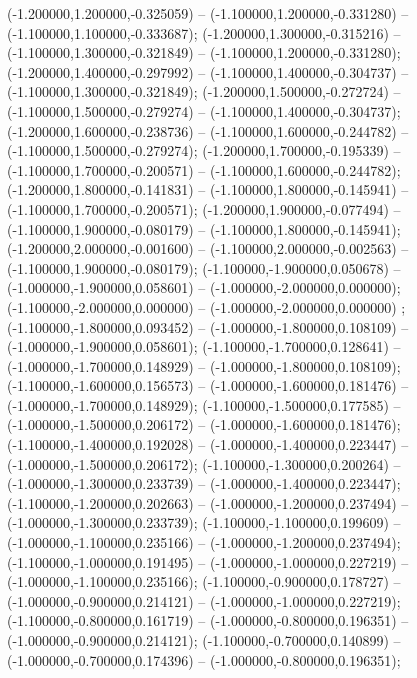  (-1.200000,1.200000,-0.325059) -- (-1.100000,1.200000,-0.331280) -- (-1.100000,1.100000,-0.333687);
 (-1.200000,1.300000,-0.315216) -- (-1.100000,1.300000,-0.321849) -- (-1.100000,1.200000,-0.331280);
 (-1.200000,1.400000,-0.297992) -- (-1.100000,1.400000,-0.304737) -- (-1.100000,1.300000,-0.321849);
 (-1.200000,1.500000,-0.272724) -- (-1.100000,1.500000,-0.279274) -- (-1.100000,1.400000,-0.304737);
 (-1.200000,1.600000,-0.238736) -- (-1.100000,1.600000,-0.244782) -- (-1.100000,1.500000,-0.279274);
 (-1.200000,1.700000,-0.195339) -- (-1.100000,1.700000,-0.200571) -- (-1.100000,1.600000,-0.244782);
 (-1.200000,1.800000,-0.141831) -- (-1.100000,1.800000,-0.145941) -- (-1.100000,1.700000,-0.200571);
 (-1.200000,1.900000,-0.077494) -- (-1.100000,1.900000,-0.080179) -- (-1.100000,1.800000,-0.145941);
 (-1.200000,2.000000,-0.001600) -- (-1.100000,2.000000,-0.002563) -- (-1.100000,1.900000,-0.080179);
 (-1.100000,-1.900000,0.050678) -- (-1.000000,-1.900000,0.058601) -- (-1.000000,-2.000000,0.000000);
 (-1.100000,-2.000000,0.000000) -- (-1.000000,-2.000000,0.000000) ;
 (-1.100000,-1.800000,0.093452) -- (-1.000000,-1.800000,0.108109) -- (-1.000000,-1.900000,0.058601);
 (-1.100000,-1.700000,0.128641) -- (-1.000000,-1.700000,0.148929) -- (-1.000000,-1.800000,0.108109);
 (-1.100000,-1.600000,0.156573) -- (-1.000000,-1.600000,0.181476) -- (-1.000000,-1.700000,0.148929);
 (-1.100000,-1.500000,0.177585) -- (-1.000000,-1.500000,0.206172) -- (-1.000000,-1.600000,0.181476);
 (-1.100000,-1.400000,0.192028) -- (-1.000000,-1.400000,0.223447) -- (-1.000000,-1.500000,0.206172);
 (-1.100000,-1.300000,0.200264) -- (-1.000000,-1.300000,0.233739) -- (-1.000000,-1.400000,0.223447);
 (-1.100000,-1.200000,0.202663) -- (-1.000000,-1.200000,0.237494) -- (-1.000000,-1.300000,0.233739);
 (-1.100000,-1.100000,0.199609) -- (-1.000000,-1.100000,0.235166) -- (-1.000000,-1.200000,0.237494);
 (-1.100000,-1.000000,0.191495) -- (-1.000000,-1.000000,0.227219) -- (-1.000000,-1.100000,0.235166);
 (-1.100000,-0.900000,0.178727) -- (-1.000000,-0.900000,0.214121) -- (-1.000000,-1.000000,0.227219);
 (-1.100000,-0.800000,0.161719) -- (-1.000000,-0.800000,0.196351) -- (-1.000000,-0.900000,0.214121);
 (-1.100000,-0.700000,0.140899) -- (-1.000000,-0.700000,0.174396) -- (-1.000000,-0.800000,0.196351);
